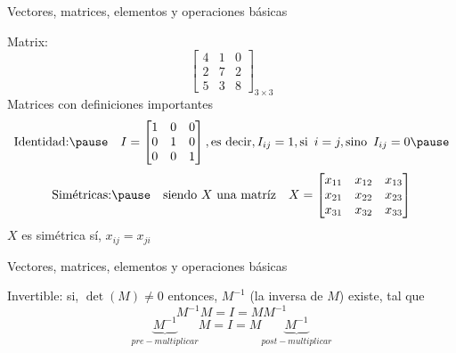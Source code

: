 \documentclass[aspectratio=169]{beamer}
\begin{document}
\begin{frame}
 {Vectores, matrices, elementos y operaciones b\'asicas}

{ \color{black}
Matrix:
\begin{equation*}
  \begin{bmatrix}
   4 & 1 & 0 \\
   2 & 7 & 2 \\
   5 & 3 & 8 
  \end{bmatrix}_{3\times3}
 \end{equation*}
 \pause
Matrices con definiciones importantes 
\vskip -0.2cm
 \begin{equation*}
 \textnormal{Identidad:} \pause \quad I = \begin{bmatrix}
   1 & 0 & 0 \\
   0 & 1 & 0 \\
   0 & 0 & 1 
  \end{bmatrix}, \textnormal{es decir}, I_{ij} = 1, \textnormal{si \,} i = j, \textnormal{sino \,} I_{ij} = 0 \pause 
 \end{equation*} 
 \begin{equation*}
     \textnormal{Sim\'etricas:} \pause \quad \textnormal{siendo $X$ una matríz}\quad X = \begin{bmatrix}
   x_{11} & x_{12} & x_{13} \\
   x_{21} & x_{22} & x_{23} \\
   x_{31} & x_{32} & x_{33} 
  \end{bmatrix} 
 \end{equation*}
 $X$ es simétrica sí, $x_{ij} = x_{ji}$
}

\end{frame}


\begin{frame}
 {Vectores, matrices, elementos y operaciones b\'asicas}

{ \color{black}
 Invertible: \pause \quad si, \quad $\det(M) \neq 0$ \quad entonces, \quad $M^{-1}$ (la inversa de $M$) existe, tal que 
 \begin{equation*}
  M^{-1}M = I = MM^{-1}
 \end{equation*}
 \pause \vskip -1.4cm
 \begin{equation*}
  \underbrace{M^{-1}}_{pre-multiplicar}M = I = M\underbrace{M^{-1}}_{post-multiplicar}
 \end{equation*}
}
 
\end{frame}
\end{document}
